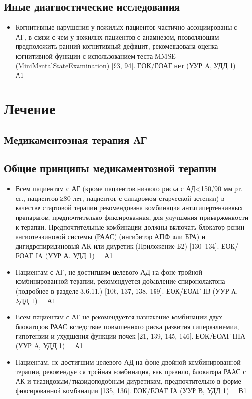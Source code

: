 \documentclass{article}%
\begin{document}
%
\subsection{Иные диагностические исследования}%
\label{subsec:}%
\begin{itemize}%
\item%
Когнитивные нарушения у пожилых пациентов частично ассоциированы с АГ, в связи с чем у пожилых пациентов с анамнезом, позволяющим предположить ранний когнитивный дефицит, рекомендована оценка когнитивной функции с использованием теста MMSE (MiniMentalStateExamination) {[}93, 94{]}.%
\newline%
ЕОК/ЕОАГ нет (УУР A, УДД 1) = А1%
\end{itemize}

%
\newpage%
\section{Лечение}%
\label{sec:}%
\subsection{Медикаментозная терапия АГ}%
\label{subsec:}%
\subsection{Общие принципы медикаментозной терапии}%
\label{subsec:}%
\begin{itemize}%
\item%
Всем пациентам с АГ (кроме пациентов низкого риска с АД<150/90 мм рт. ст., пациентов ≥80 лет, пациентов с синдромом старческой астении) в качестве стартовой терапии рекомендована комбинация антигипертензивных препаратов, предпочтительно фиксированная, для улучшения приверженности к терапии. Предпочтительные комбинации должны включать блокатор ренин{-}ангиотензиновой системы (РААС) (ингибитор АПФ или БРА) и дигидропиридиновый АК или диуретик (Приложение Б2) {[}130–134{]}.%
\newline%
ЕОК/ЕОАГ IA (УУР А, УДД 1) = А1%
\item%
Пациентам с АГ, не достигшим целевого АД на фоне тройной комбинированной терапии, рекомендуется добавление спиронолактона (подробнее в разделе 3.6.11.) {[}106, 137, 138, 169{]}.%
\newline%
ЕОК/ЕОАГ IB (УУР А, УДД 1) = А1%
\item%
Всем пациентам с АГ не рекомендуется назначение комбинации двух блокаторов РААС вследствие повышенного риска развития гиперкалиемии, гипотензии и ухудшения функции почек {[}21, 139, 145, 146{]}.%
\newline%
ЕОК/ЕОАГ IIIА (УУР A, УДД 1) = А1%
\item%
Пациентам, не достигшим целевого АД на фоне двойной комбинированной терапии, рекомендуется тройная комбинация, как правило, блокатора РААС с АК и тиазидовым/тиазидоподобным диуретиком, предпочтительно в форме фиксированной комбинации {[}135, 136{]}.%
\newline%
ЕОК/ЕОАГ IА (УУР В, УДД 1) = В1%
\end{itemize}
\end{document}
